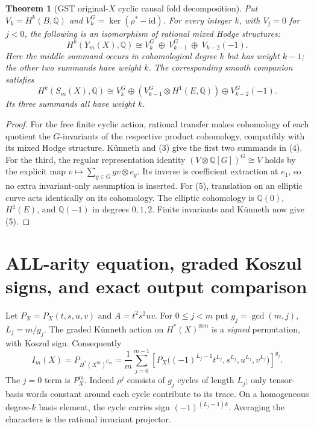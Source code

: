 \documentclass[11pt]{article}
\newtheorem{theorem}{Theorem}
\begin{document}
\begin{theorem}[GST original-$X$ cyclic causal fold decomposition]
Put $V_k=H^k(B,\mathbb Q)$ and $V_k^G=\ker(\rho^*-\mathrm{id})$.
For every integer $k$, with $V_j=0$ for $j<0$, the following is
an isomorphism of rational mixed Hodge structures:
\[
 \boxed{\quad
 H^k(Y_m(X),\mathbb Q)\cong
 V_k^G\ \oplus\ V_{k-1}^G\
                  \oplus\ V_{k-2}(-1).
 \quad}                                                \tag{4}
\]
Here the middle summand occurs in cohomological degree $k$
but has weight $k-1$; the other two summands have weight $k$.
The corresponding smooth companion satisfies
\[
 \boxed{\quad
 H^k(S_m(X),\mathbb Q)\cong
 V_k^G \oplus
 (V_{k-1}^G\otimes H^1(E,\mathbb Q))
 \oplus V_{k-2}^G(-1).
 \quad}                                                \tag{5}
\]
Its three summands all have weight $k$.
\end{theorem}
\begin{proof}
For the free finite cyclic action, rational transfer makes
cohomology of each quotient the $G$-invariants of the respective
product cohomology, compatibly with its mixed Hodge structure.
K\"unneth and (3) give the first two summands in (4). For the third,
the regular representation identity
$(V\otimes\mathbb Q[G])^G\cong V$ holds by the explicit map
$v\mapsto\sum_{g\in G}g v\otimes e_g$.
Its inverse is coefficient extraction at $e_1$, so no
extra invariant-only assumption is inserted.
For (5), translation on an elliptic curve acts identically on
its cohomology. The elliptic cohomology is $\mathbb Q(0)$,
$H^1(E)$, and $\mathbb Q(-1)$ in degrees $0,1,2$.
Finite invariants and K\"unneth now give (5).
\end{proof}

\section{ALL-arity equation, graded Koszul signs, and exact output comparison}
Let $P_X=P_X(t,s,u,v)$ and $A=t^2s^2uv$. For
$0\leq j<m$ put $g_j=\gcd(m,j)$, $L_j=m/g_j$.
The graded K\"unneth action on $H^*(X)^{\otimes m}$ is a
\emph{signed} permutation, with Koszul sign. Consequently
\[
 \boxed{\quad
 I_m(X)=P_{H^*(X^m)^{C_m}}
 =\frac1m\sum_{j=0}^{m-1}
 \left[
   P_X\bigl((-1)^{L_j-1}t^{L_j},
            s^{L_j},u^{L_j},v^{L_j}\bigr)
 \right]^{g_j}.
 \quad}                                                \tag{6}
\]
The $j=0$ term is $P_X^m$.
Indeed $\rho^j$ consists of $g_j$ cycles of length $L_j$;
only tensor-basis words constant around each cycle contribute
to its trace. On a homogeneous degree-$k$ basis element, the
cycle carries sign $(-1)^{(L_j-1)k}$. Averaging the characters
is the rational invariant projector.
\end{document}
